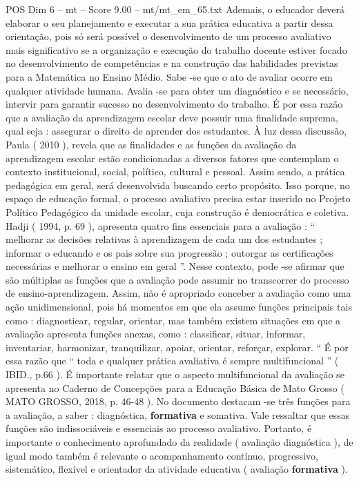 \begin{textsample}{POS Dim 6 – mt – Score 9.00 – mt/mt\_em\_65.txt}
Ademais, o educador deverá elaborar o seu planejamento e executar a sua prática educativa a partir dessa orientação, pois só será possível o desenvolvimento de um processo avaliativo mais significativo se a organização e execução do trabalho docente estiver focado no desenvolvimento de competências e na construção das habilidades previstas para a Matemática no Ensino Médio.
Sabe -se que o ato de avaliar ocorre em qualquer atividade humana.
Avalia -se para obter um diagnóstico e se necessário, intervir para garantir sucesso no desenvolvimento do trabalho.
É por essa razão que a avaliação da aprendizagem escolar deve possuir uma finalidade suprema, qual seja : assegurar o direito de aprender dos estudantes.
À luz dessa discussão, Paula ( 2010 ), revela que as finalidades e as funções da avaliação da aprendizagem escolar estão condicionadas a diversos fatores que contemplam o contexto institucional, social, político, cultural e pessoal.
Assim sendo, a prática pedagógica em geral, será desenvolvida buscando certo propósito.
Isso porque, no espaço de educação formal, o processo avaliativo precisa estar inserido no Projeto Político Pedagógico da unidade escolar, cuja construção é democrática e coletiva.
Hadji ( 1994, p. 69 ), apresenta quatro fins essenciais para a avaliação : “ melhorar as decisões relativas à aprendizagem de cada um dos estudantes ; informar o educando e os pais sobre sua progressão ; outorgar as certificações necessárias e melhorar o ensino em geral ”.
Nesse contexto, pode -se afirmar que são múltiplas as funções que a avaliação pode assumir no transcorrer do processo de ensino-aprendizagem.
Assim, não é apropriado conceber a avaliação como uma ação unidimensional, pois há momentos em que ela assume funções principais tais como : diagnosticar, regular, orientar, mas também existem situações em que a avaliação apresenta funções anexas, como : classificar, situar, informar, inventariar, harmonizar, tranquilizar, apoiar, orientar, reforçar, explorar. “ É por essa razão que “ toda e qualquer prática avaliativa é sempre multifuncional ” ( IBID., p.66 ).
É importante relatar que o aspecto multifuncional da avaliação se apresenta no Caderno de Concepções para a Educação Básica de Mato Grosso ( MATO GROSSO, 2018, p. 46-48 ).
No documento destacam -se três funções para a avaliação, a saber : diagnóstica, \textbf{formativa} e somativa.
Vale ressaltar que essas funções são indissociáveis e essenciais ao processo avaliativo.
Portanto, é importante o conhecimento aprofundado da realidade ( avaliação diagnóstica ), de igual modo também é relevante o acompanhamento contínuo, progressivo, sistemático, flexível e orientador da atividade educativa ( avaliação \textbf{formativa} ).

\end{textsample}

